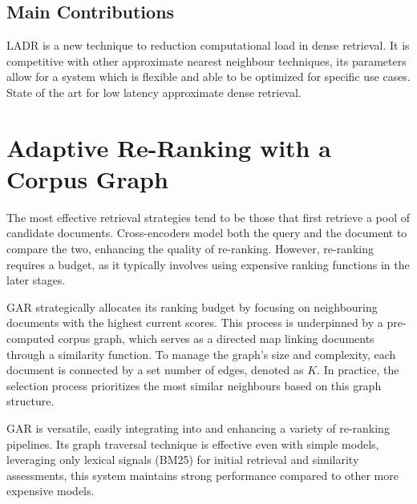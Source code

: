 \documentclass[sigconf,authorversion,nonacm]{acmart}
\begin{document}
\subsection{Main Contributions}

LADR is a new technique to reduction computational load in dense retrieval. It is competitive with
other approximate nearest neighbour techniques, its parameters allow for a system which is flexible
and able to be optimized for specific use cases. State of the art for low latency approximate dense
retrieval.

\section{Adaptive Re-Ranking with a Corpus Graph}

The most effective retrieval strategies tend to be those that first retrieve a pool of candidate
documents. Cross-encoders model both the query and the document to compare the two, enhancing the
quality of re-ranking. However, re-ranking requires a budget, as it typically involves using
expensive ranking functions in the later stages.

GAR strategically allocates its ranking budget by focusing on neighbouring documents with the highest
current scores. This process is underpinned by a pre-computed corpus graph, which serves as a
directed map linking documents through a similarity function. To manage the graph's size and
complexity, each document is connected by a set number of edges, denoted as \(K\). In practice, the
selection process prioritizes the most similar neighbours based on this graph structure.

GAR is versatile, easily integrating into and enhancing a variety of re-ranking pipelines. Its graph
traversal technique is effective even with simple models, leveraging only lexical signals (BM25) for
initial retrieval and similarity assessments, this system maintains strong performance
compared to other more expensive models.
\end{document}
